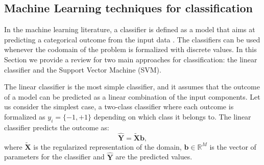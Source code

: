 \subsection{Machine Learning techniques for classification}\label{sec:ML:classifiers}
In the machine learning literature, a classifier is defined as a model that aims at predicting a categorical outcome from the input data \cite{PAMI}. The classifiers can be used whenever the codomain of the problem is formalized with discrete values. In this Section we provide a review for two main approaches for classification: the linear classifier and the Support Vector Machine (SVM).




The linear classifier is the most simple classifier, and it assumes that the outcome of a model can be predicted as a linear combination of the input components. Let us consider the simplest case, a two-class classifier where each outcome is formalized as $y_i=\{-1,+1\}$ depending on which class it belongs to. The linear classifier predicts the outcome as: 
\begin{equation}
\hat{\mathbf{Y}}=\tilde{\mathbf{X}} \mathbf{b},
\label{eq:ML:linClassPred}
\end{equation}
where $\tilde{\mathbf{X}}$ is the regularized representation of the domain, $\mathbf{b} \in \mathbb{R}^{M}$ is the vector of parameters for the classifier and $\hat{\mathbf{Y}}$ are the predicted values. 

